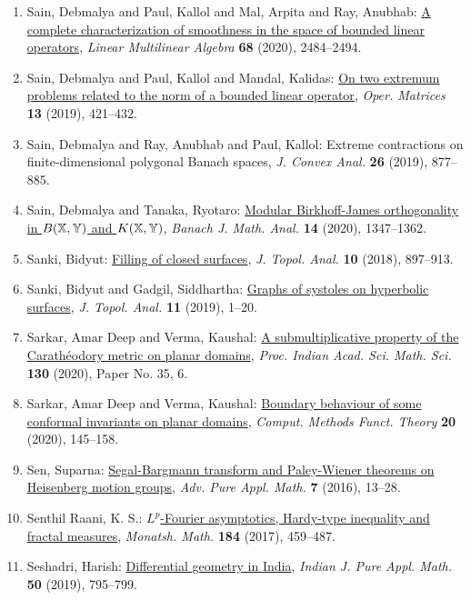 \begin{enumerate}
\item Sain, Debmalya and Paul, Kallol and Mal, Arpita and Ray,
Anubhab: \href{https://doi.org/10.1080/03081087.2019.1586824}{A complete characterization of smoothness in the space of
bounded linear operators}, \emph{Linear Multilinear Algebra} {\bf 68} (2020), 2484--2494.
\item Sain, Debmalya and Paul, Kallol and Mandal, Kalidas: \href{https://doi.org/10.7153/oam-2019-13-31}{On two extremum problems related to the norm of a bounded
linear operator}, \emph{Oper. Matrices} {\bf 13} (2019), 421--432.
\item Sain, Debmalya and Ray, Anubhab and Paul, Kallol: Extreme contractions on finite-dimensional polygonal {B}anach
spaces, \emph{J. Convex Anal.} {\bf 26} (2019), 877--885.
\item Sain, Debmalya and Tanaka, Ryotaro: \href{https://doi.org/10.1007/s43037-020-00064-z}{Modular {B}irkhoff-{J}ames orthogonality in {$B(\Bbb{X,Y})$}
and {$K(\Bbb{X,Y})$}}, \emph{Banach J. Math. Anal.} {\bf 14} (2020), 1347--1362.
\item Sanki, Bidyut: \href{https://doi.org/10.1142/S1793525318500309}{Filling of closed surfaces}, \emph{J. Topol. Anal.} {\bf 10} (2018), 897--913.
\item Sanki, Bidyut and Gadgil, Siddhartha: \href{https://doi.org/10.1142/S1793525319500018}{Graphs of systoles on hyperbolic surfaces}, \emph{J. Topol. Anal.} {\bf 11} (2019), 1--20.
\item Sarkar, Amar Deep and Verma, Kaushal: \href{https://doi.org/10.1007/s12044-020-00565-9}{A submultiplicative property of the {C}arath\'{e}odory metric on
planar domains}, \emph{Proc. Indian Acad. Sci. Math. Sci.} {\bf 130} (2020), Paper No. 35, 6.
\item Sarkar, Amar Deep and Verma, Kaushal: \href{https://doi.org/10.1007/s40315-020-00303-2}{Boundary behaviour of some conformal invariants on planar
domains}, \emph{Comput. Methods Funct. Theory} {\bf 20} (2020), 145--158.
\item Sen, Suparna: \href{https://doi.org/10.1515/apam-2015-0010}{Segal-{B}argmann transform and {P}aley-{W}iener theorems on
{H}eisenberg motion groups}, \emph{Adv. Pure Appl. Math.} {\bf 7} (2016), 13--28.
\item Senthil Raani, K. S.: \href{https://doi.org/10.1007/s00605-017-1081-7}{{$L^p$}-{F}ourier asymptotics, {H}ardy-type inequality and
fractal measures}, \emph{Monatsh. Math.} {\bf 184} (2017), 459--487.
\item Seshadri, Harish: \href{https://doi.org/10.1007/s13226-019-0355-2}{Differential geometry in {I}ndia}, \emph{Indian J. Pure Appl. Math.} {\bf 50} (2019), 795--799.

\end{enumerate}

